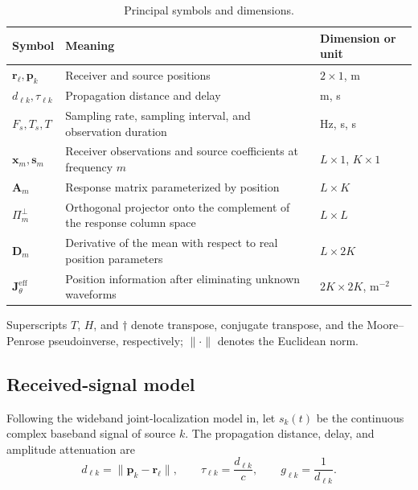 \documentclass[11pt,a4paper]{article}
\numberwithin{equation}{section}
\numberwithin{figure}{section}
\numberwithin{table}{section}
\begin{document}
\begin{table}[H]
\centering
\caption{Principal symbols and dimensions.}\label{tab:2.1}
\small
\setlength{\tabcolsep}{4pt}
\renewcommand{\arraystretch}{1.2}
\begin{tabularx}{\linewidth}{Y{0.85}Y{1.35}Y{0.8}}
\toprule
\textbf{Symbol} & \textbf{Meaning} & \textbf{Dimension or unit} \\
\midrule
$\mathbf{r}_\ell,\mathbf{p}_k$ & Receiver and source positions & $2\times1$, m \\
$d_{\ell k},\tau_{\ell k}$ & Propagation distance and delay & m, s \\
$F_s,T_s,T$ & Sampling rate, sampling interval, and observation duration & Hz, s, s \\
$\mathbf{x}_m,\mathbf{s}_m$ & Receiver observations and source coefficients at frequency $m$ & $L\times1$, $K\times1$ \\
$\mathbf{A}_m$ & Response matrix parameterized by position & $L\times K$ \\
$\Pi_m^\perp$ & Orthogonal projector onto the complement of the response column space & $L\times L$ \\
$\mathbf{D}_m$ & Derivative of the mean with respect to real position parameters & $L\times2K$ \\
$\mathbf{J}_{\theta}^{\mathrm{eff}}$ & Position information after eliminating unknown waveforms & $2K\times2K$, m$^{-2}$ \\
\bottomrule
\end{tabularx}
\end{table}

Superscripts $T$, $H$, and $\dagger$ denote transpose, conjugate transpose, and the Moore--Penrose pseudoinverse, respectively; $\|\cdot\|$ denotes the Euclidean norm.

\subsection{Received-signal model}\label{sec:2.2}

Following the wideband joint-localization model in\cite{ref05}, let $s_k(t)$ be the continuous complex baseband signal of source $k$. The propagation distance, delay, and amplitude attenuation are
\begin{equation}\label{eq:2.2}
d_{\ell k}=\|\mathbf{p}_k-\mathbf{r}_\ell\|, \qquad \tau_{\ell k}=\frac{d_{\ell k}}{c}, \qquad g_{\ell k}=\frac{1}{d_{\ell k}}.
\end{equation}
\end{document}
